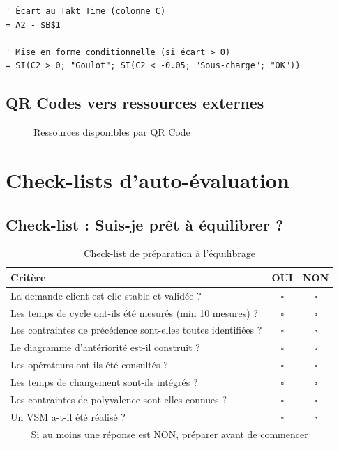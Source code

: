 \documentclass[12pt,a4paper]{article}
\begin{document}
\begin{center}
\begin{verbatim}
' Écart au Takt Time (colonne C)
= A2 - $B$1

' Mise en forme conditionnelle (si écart > 0)
= SI(C2 > 0; "Goulot"; SI(C2 < -0.05; "Sous-charge"; "OK"))
\end{verbatim}

\subsection{QR Codes vers ressources externes}

\begin{figure}[H]
\centering
{}
\caption{Ressources disponibles par QR Code}
\label{fig:qrcodes}
\end{figure}

\section{Check-lists d'auto-évaluation}

\subsection{Check-list : Suis-je prêt à équilibrer ?}

\begin{table}[H]
\centering
\caption{Check-list de préparation à l'équilibrage}
\label{tab:checklist_preparation}
\begin{tabular}{|l|c|c|}
\hline
\textbf{Critère} & \textbf{OUI} & \textbf{NON} \\ \hline
La demande client est-elle stable et validée ? & $\square$ & $\square$ \\
Les temps de cycle ont-ils été mesurés (min 10 mesures) ? & $\square$ & $\square$ \\
Les contraintes de précédence sont-elles toutes identifiées ? & $\square$ & $\square$ \\
Le diagramme d'antériorité est-il construit ? & $\square$ & $\square$ \\
Les opérateurs ont-ils été consultés ? & $\square$ & $\square$ \\
Les temps de changement sont-ils intégrés ? & $\square$ & $\square$ \\
Les contraintes de polyvalence sont-elles connues ? & $\square$ & $\square$ \\
Un VSM a-t-il été réalisé ? & $\square$ & $\square$ \\
\hline
\multicolumn{3}{|c|}{Si au moins une réponse est NON, préparer avant de commencer} \\
\hline
\end{tabular}
\end{table}


\end{center}
\end{document}
